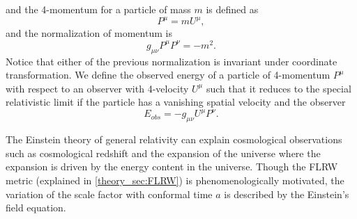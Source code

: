 and the 4-momentum for a particle of mass $m$ is defined as
\begin{equation}
    P^{\mu} = m U^{\mu},
\end{equation}
and the normalization of momentum is 
\begin{equation} \label{eq:momentum_noermal}
    g_{\mu \nu}P^{\mu}P^{\nu} = -m^2.
\end{equation}
Notice that either of the previous normalization is invariant under coordinate transformation. We define the observed energy of a particle of 4-momentum $P^{\mu}$ with respect to an observer with 4-velocity $U^{\mu}$ such that it reduces to the special relativistic limit if the particle has a vanishing spatial velocity and the observer 
\begin{equation} \label{eq:energy}
    E_{obs} = -g_{\mu \nu} U^{\mu} P^{\nu}.
\end{equation}




The Einstein theory of general relativity can explain cosmological observations such as cosmological redshift and the expansion of the universe where the expansion is driven by the energy content in the universe. Though the FLRW metric (explained in \ref{theory_sec:FLRW}) is phenomenologically motivated, the variation of the scale factor with conformal time $a$ is described by the Einstein's field equation. 





